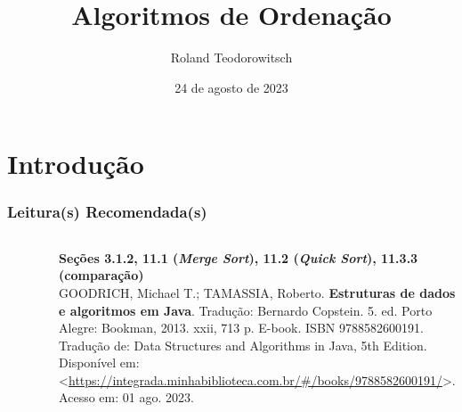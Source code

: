 \documentclass[aspectratio=169]{beamer}
\title[\sc{Algoritmos de Ordenação}]{Algoritmos de Ordenação}
\author[Roland Teodorowitsch]{Roland Teodorowitsch}
\institute[ALEST I - EP - PUCRS]{Algoritmos e Estruturas de Dados I - Escola Politécnica - PUCRS}
\date{24 de agosto de 2023}
\begin{document}
\justifying

\begin{frame}
	\titlepage
\end{frame}

\section{Introdução}

\begin{frame}\frametitle{Leitura(s) Recomendada(s)}

\begin{columns}[T]
\begin{column}{0.15\linewidth}
\vspace{-3mm}
\begin{figure}[h]
	\centering
	\includegraphics[height=0.3\paperheight]{imagens/livro_goodrich.jpg}
\end{figure}
\end{column}
\begin{column}{0.85\linewidth}
\vspace{3mm}
\textbf{Seções 3.1.2, 11.1 (\emph{Merge Sort}), 11.2 (\emph{Quick Sort}), 11.3.3 (comparação)}\\
\scriptsize{GOODRICH, Michael T.; TAMASSIA, Roberto. \textbf{Estruturas de dados e algoritmos em Java}. Tradução: Bernardo Copstein. 5. ed. Porto Alegre: Bookman, 2013. xxii, 713 p. E-book. ISBN 9788582600191. Tradução de: Data Structures and Algorithms in Java, 5th Edition. Disponível em: \textless{}\url{https://integrada.minhabiblioteca.com.br/\#/books/9788582600191/}\textgreater{}. Acesso em: 01 ago. 2023.}
\end{column}
\end{columns}

\end{frame}
\end{document}
